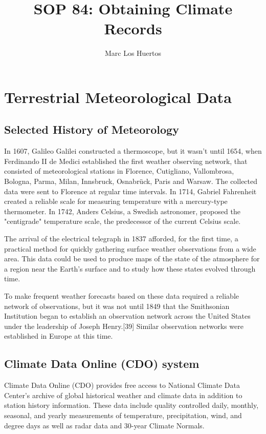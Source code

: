 \documentclass{article}\usepackage[]{graphicx}\usepackage[]{color}
\title{SOP 84: Obtaining Climate Records}
\author{Marc Los Huertos}
\begin{document}
\maketitle

\section{Terrestrial Meteorological Data}

\subsection{Selected History of Meteorology}

In 1607, Galileo Galilei constructed a thermoscope, but it wasn't until 1654, when Ferdinando II de Medici established the first weather observing network, that consisted of meteorological stations in Florence, Cutigliano, Vallombrosa, Bologna, Parma, Milan, Innsbruck, Osnabrück, Paris and Warsaw. The collected data were sent to Florence at regular time intervals. In 1714, Gabriel Fahrenheit created a reliable scale for measuring temperature with a mercury-type thermometer. In 1742, Anders Celsius, a Swedish astronomer, proposed the "centigrade" temperature scale, the predecessor of the current Celsius scale.

The arrival of the electrical telegraph in 1837 afforded, for the first time, a practical method for quickly gathering surface weather observations from a wide area. This data could be used to produce maps of the state of the atmosphere for a region near the Earth's surface and to study how these states evolved through time. 

To make frequent weather forecasts based on these data required a reliable network of observations, but it was not until 1849 that the Smithsonian Institution began to establish an observation network across the United States under the leadership of Joseph Henry.[39] Similar observation networks were established in Europe at this time. 
\subsection{Climate Data Online (CDO) system}

Climate Data Online (CDO) provides free access to National Climate Data Center's archive of global historical weather and climate data in addition to station history information. These data include quality controlled daily, monthly, seasonal, and yearly measurements of temperature, precipitation, wind, and degree days as well as radar data and 30-year Climate Normals. 
\end{document}

